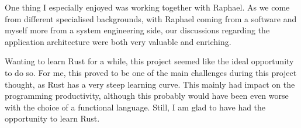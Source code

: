 One thing I especially enjoyed was working together with Raphael. As we come from different specialised backgrounds, with Raphael coming from a software and myself more from a system engineering side, our discussions regarding the application architecture were both very valuable and enriching.

Wanting to learn Rust for a while, this project seemed like the ideal opportunity to do so. For me, this proved to be one of the main challenges during this project thought, as Rust has a very steep learning curve. This mainly had impact on the programming productivity, although this probably would have been even worse with the choice of a functional language. Still, I am glad to have had the opportunity to learn Rust.